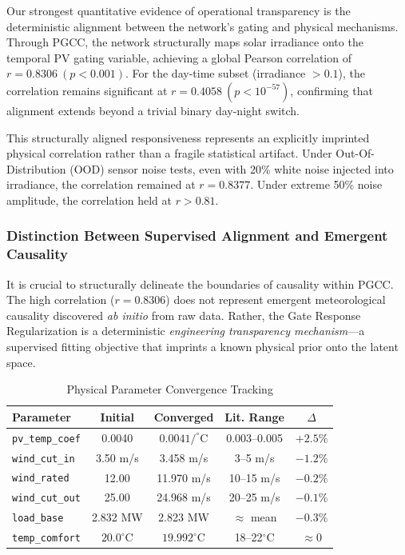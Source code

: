 Our strongest quantitative evidence of operational transparency is the deterministic alignment between the network's gating and physical mechanisms. Through PGCC, the network structurally maps solar irradiance onto the temporal PV gating variable, achieving a global Pearson correlation of $r = 0.8306 \ (p < 0.001)$. For the day-time subset (irradiance $> 0.1$), the correlation remains significant at $r = 0.4058 \ (p < 10^{-57})$, confirming that alignment extends beyond a trivial binary day-night switch.

This structurally aligned responsiveness represents an explicitly imprinted physical correlation rather than a fragile statistical artifact. Under Out-Of-Distribution (OOD) sensor noise tests, even with 20\% white noise injected into irradiance, the correlation remained at $r = 0.8377$. Under extreme 50\% noise amplitude, the correlation held at $r > 0.81$.

\subsubsection{Distinction Between Supervised Alignment and Emergent Causality}
It is crucial to structurally delineate the boundaries of causality within PGCC. The high correlation ($r=0.8306$) does not represent emergent meteorological causality discovered \textit{ab initio} from raw data. Rather, the Gate Response Regularization is a deterministic \textit{engineering transparency mechanism}---a supervised fitting objective that imprints a known physical prior onto the latent space.

\begin{table}[htbp]
\centering
\caption{Physical Parameter Convergence Tracking}
\label{tab:physical_params}
\footnotesize
\setlength{\tabcolsep}{3pt}
\begin{tabular*}{\columnwidth}{@{\extracolsep{\fill}}lcccc@{}}
\toprule
Parameter & Initial & Converged & Lit. Range & $\Delta$ \\
\midrule
\texttt{pv\_temp\_coef} & 0.0040 & $0.0041/^\circ$C & 0.003--0.005 & $+2.5\%$ \\
\texttt{wind\_cut\_in} & 3.50 m/s & 3.458 m/s & 3--5 m/s & $-1.2\%$ \\
\texttt{wind\_rated} & 12.00 & 11.970 m/s & 10--15 m/s & $-0.2\%$ \\
\texttt{wind\_cut\_out} & 25.00 & 24.968 m/s & 20--25 m/s & $-0.1\%$ \\
\texttt{load\_base} & 2.832 MW & 2.823 MW & $\approx$ mean & $-0.3\%$ \\
\texttt{temp\_comfort} & $20.0^\circ$C & $19.992^\circ$C & 18--22$^\circ$C & $\approx 0$ \\
\bottomrule
\end{tabular*}
\end{table}

